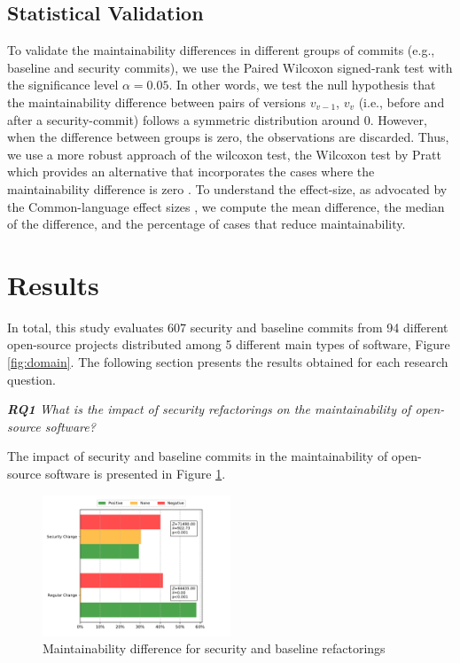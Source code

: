 \documentclass[10pt,conference]{IEEEtran}
\begin{document}
\subsection{Statistical Validation}\label{sec:statsval}

To validate the maintainability differences in different groups of commits (e.g., baseline and security commits), we use the Paired Wilcoxon signed-rank test \cite{10.2307/3001968} with the significance level $\alpha = 0.05$. In other words, we test the null hypothesis that the maintainability difference between pairs of versions $v_{v-1}$, $v_v$ (i.e., before and after a security-commit) follows a symmetric distribution around $0$. However, when the difference between groups is zero, the observations are discarded. Thus, we use a more robust approach of the wilcoxon test, the Wilcoxon test by Pratt which provides an alternative that incorporates the cases where the maintainability difference is zero \cite{10.2307/2282543}. To understand the effect-size, as advocated by the Common-language effect sizes \cite{graw:1992}, we compute the mean difference, the median of the difference, and the percentage of cases that reduce maintainability.

\section{Results}\label{sec:results}

In total, this study evaluates $607$ security and baseline commits from 94 different open-source projects distributed among 5 different main types of software, Figure \ref{fig:domain}. The following section presents the results obtained for each research question.

\begin{framed}
\textit{\textbf{RQ1} What is the impact of security refactorings on the maintainability of open-source software?}
\end{framed}

The impact of security and baseline commits in the maintainability of open-source software is presented in Figure \ref{fig:secvsreg}. 

\begin{figure}[h]
 	\centering 	\includegraphics[width=0.5\textwidth]{figures/maintainability.pdf}
 	\caption{Maintainability difference for security and baseline refactorings}
	\label{fig:secvsreg}
\end{figure}
\end{document}
